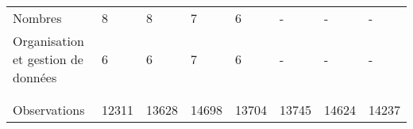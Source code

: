 \documentclass[
]{book}
\begin{document}
\begin{landscape}
\begin{ThreePartTable}
\begin{longtable}[t]{llllllll}
\hspace{1em}Nombres & 8 & 8 & 7 & 6 & - & - & -\\
\hspace{1em}Organisation et gestion de données & 6 & 6 & 7 & 6 & - & - & -\\
\hspace{1em} &  &  &  &  &  &  \vphantom{1} & \\
 &  &  &  &  &  &  & \\
Observations & 12311 & 13628 & 14698 & 13704 & 13745 & 14624 & 14237\\*
\end{longtable}
\end{ThreePartTable}
\endgroup{}
\end{landscape}

\newpage  
\begingroup\fontsize{8}{10}\selectfont
\end{document}
